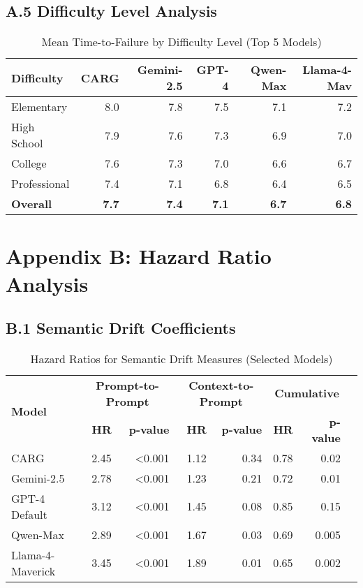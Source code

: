 \documentclass[letterpaper]{article}
\begin{document}
\subsection*{A.5 Difficulty Level Analysis}

\begin{table}[ht]
\centering
\caption{Mean Time-to-Failure by Difficulty Level (Top 5 Models)}
\label{tab:difficulty_analysis}
\begin{tabular}{lrrrrr}
\toprule
\textbf{Difficulty} & \textbf{CARG} & \textbf{Gemini-2.5} & \textbf{GPT-4} & \textbf{Qwen-Max} & \textbf{Llama-4-Mav} \\
\midrule
Elementary & 8.0 & 7.8 & 7.5 & 7.1 & 7.2 \\
High School & 7.9 & 7.6 & 7.3 & 6.9 & 7.0 \\
College & 7.6 & 7.3 & 7.0 & 6.6 & 6.7 \\
Professional & 7.4 & 7.1 & 6.8 & 6.4 & 6.5 \\
\midrule
\textbf{Overall} & \textbf{7.7} & \textbf{7.4} & \textbf{7.1} & \textbf{6.7} & \textbf{6.8} \\
\bottomrule
\end{tabular}
\end{table}

\section*{Appendix B: Hazard Ratio Analysis}

\subsection*{B.1 Semantic Drift Coefficients}

\begin{table}[ht]
\centering
\caption{Hazard Ratios for Semantic Drift Measures (Selected Models)}
\label{tab:hazard_ratios}
\begin{tabular}{lrrrrrrr}
\toprule
\multirow{2}{*}{\textbf{Model}} & \multicolumn{2}{c}{\textbf{Prompt-to-Prompt}} & \multicolumn{2}{c}{\textbf{Context-to-Prompt}} & \multicolumn{2}{c}{\textbf{Cumulative}} \\
\cmidrule(lr){2-3} \cmidrule(lr){4-5} \cmidrule(lr){6-7}
& \textbf{HR} & \textbf{p-value} & \textbf{HR} & \textbf{p-value} & \textbf{HR} & \textbf{p-value} \\
\midrule
CARG & 2.45 & <0.001 & 1.12 & 0.34 & 0.78 & 0.02 \\
Gemini-2.5 & 2.78 & <0.001 & 1.23 & 0.21 & 0.72 & 0.01 \\
GPT-4 Default & 3.12 & <0.001 & 1.45 & 0.08 & 0.85 & 0.15 \\
Qwen-Max & 2.89 & <0.001 & 1.67 & 0.03 & 0.69 & 0.005 \\
Llama-4-Maverick & 3.45 & <0.001 & 1.89 & 0.01 & 0.65 & 0.002 \\
\bottomrule
\end{tabular}
\end{table}
\end{document}
